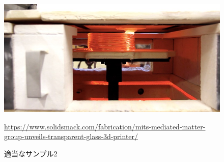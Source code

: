 \begin{figure}[H]
  \centering
  \includegraphics[width=12truecm]{./fig/Additive3.jpg}
  \caption{適当なサンプル2}
  \url{https://www.solidsmack.com/fabrication/mits-mediated-matter-group-unveils-transparent-glass-3d-printer/} %
  \label{fig:ferret}
\end{figure}

